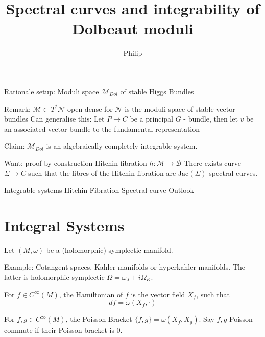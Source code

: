 % 


\title{Spectral curves and integrability of Dolbeaut moduli}
\author{Philip}
\date{}

 
\maketitle

Rationale setup:
Moduli space $\mathcal{M}_{Dol} $ of stable Higgs Bundles 

Remark:
$\mathcal{M} \subset T^* \mathcal{N} $ open dense for $\mathcal{N} $ is the moduli space of stable vector bundles
Can generalise this: 
Let $ P \rightarrow  C $ be a principal $G$ - bundle, 
then let $v$ be an associated vector bundle to the fundamental representation 

Claim: $ \mathcal{M} _{Dol} $ is an algebraically completely integrable system. 

Want: proof by construction 
Hitchin fibration $h : \mathcal{M} \rightarrow \mathcal{B}$ 
There exists curve $ \Sigma \rightarrow  C $ such that the fibres of the Hitchin fibration are $\mathrm{Jac}(\Sigma) $ spectral curves. 



Integrable systems 
Hitchin Fibration 
Spectral curve 
Outlook

\section{Integral Systems} %

Let $(M,\omega) $ be a (holomorphic) symplectic manifold. 

Example: Cotangent spaces, Kahler manifolds or hyperkahler manifolds. 
The latter is holomorphic symplectic $\Omega = \omega_J + i \Omega_K $. 

\begin{definition}
     For $ f \in C^{\infty} (M) $, the Hamiltonian of $f$ is the vector field $X_f $, such that 
     \begin{equation}
            df = \omega(X_f, \cdot) 
     \end{equation}
\end{definition}

\begin{definition}
    For $ f,g \in C^{\infty}(M)$, the Poisson Bracket $\{f, g\} = \omega(X_f, X_g) $. 
    Say $f,g$ Poisson commute if their Poisson bracket is 0. 
\end{definition}

